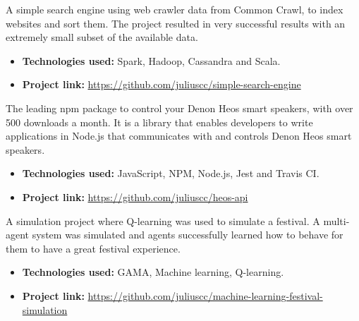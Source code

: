 

A simple search engine using web crawler data from Common Crawl, to index websites and sort them. The project resulted in very successful results with an extremely small subset of the available data.

\vspace{6pt}

\begin{itemize}
    \item \textbf{Technologies used:} Spark, Hadoop, Cassandra and Scala.
    \item \textbf{Project link:} \href{https://github.com/juliuscc/simple-search-engine}{https://github.com/juliuscc/simple-search-engine}
\end{itemize}

\divider

The leading npm package to control your Denon Heos smart speakers, with over 500 downloads a month. It is a library that enables developers to write applications in Node.js that communicates with and controls Denon Heos smart speakers.

\vspace{6pt}

\begin{itemize}
    \item \textbf{Technologies used:} JavaScript, NPM, Node.js, Jest and Travis CI.
    \item \textbf{Project link:} \href{https://github.com/juliuscc/heos-api}{https://github.com/juliuscc/heos-api}
\end{itemize}

\divider

A simulation project where Q-learning was used to simulate a festival. A multi-agent system was simulated and agents successfully learned how to behave for them to have a great festival experience.

\vspace{6pt}

\begin{itemize}
    \item \textbf{Technologies used:} GAMA, Machine learning, Q-learning.
    \item \textbf{Project link:} \href{https://github.com/juliuscc/machine-learning-festival-simulation}{https://github.com/juliuscc/machine-learning-festival-simulation}
\end{itemize}



